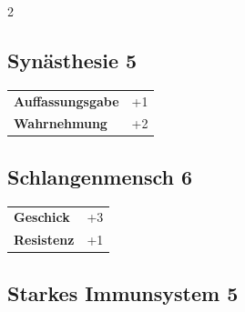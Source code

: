 \begin{multicols}{2}
\begin{tcolorbox}

\end{tcolorbox}

\begin{tcolorbox}
    \subsection*{Synästhesie \hfill \small{5 }}
    \tcblower




\begin{tabular}{@{}ll@{}}
    \textbf{Auffassungsgabe} & +1\\
    \textbf{Wahrnehmung} & +2\\
\end{tabular}


\end{tcolorbox}

\begin{tcolorbox}
    \subsection*{Schlangenmensch \hfill \small{6 }}
    \tcblower




\begin{tabular}{@{}ll@{}}
    \textbf{Geschick} & +3\\
    \textbf{Resistenz} & +1\\
\end{tabular}


\end{tcolorbox}

\begin{tcolorbox}
    \subsection*{Starkes Immunsystem \hfill \small{5 }}
    \tcblower





\end{tcolorbox}
\end{multicols}
